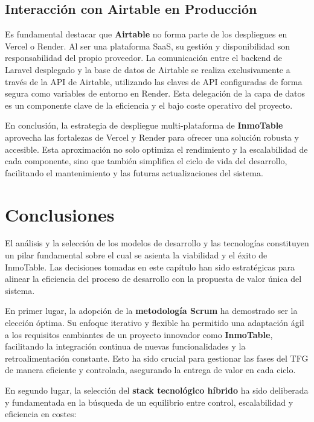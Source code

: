 \subsection{Interacción con Airtable en Producción}


Es fundamental destacar que \textbf{Airtable} no forma parte de los despliegues en Vercel o Render. Al ser una plataforma SaaS, su gestión y disponibilidad son responsabilidad del propio proveedor. La comunicación entre el backend de Laravel desplegado y la base de datos de Airtable se realiza exclusivamente a través de la API de Airtable, utilizando las claves de API configuradas de forma segura como variables de entorno en Render. Esta delegación de la capa de datos es un componente clave de la eficiencia y el bajo coste operativo del proyecto.

\clearpage

En conclusión, la estrategia de despliegue multi-plataforma de \textbf{InmoTable} aprovecha las fortalezas de Vercel y Render para ofrecer una solución robusta y accesible. Esta aproximación no solo optimiza el rendimiento y la escalabilidad de cada componente, sino que también simplifica el ciclo de vida del desarrollo, facilitando el mantenimiento y las futuras actualizaciones del sistema.


\section{Conclusiones}


El análisis y la selección de los modelos de desarrollo y las tecnologías constituyen un pilar fundamental sobre el cual se asienta la viabilidad y el éxito de InmoTable. Las decisiones tomadas en este capítulo han sido estratégicas para alinear la eficiencia del proceso de desarrollo con la propuesta de valor única del sistema.

En primer lugar, la adopción de la \textbf{metodología Scrum} ha demostrado ser la elección óptima. Su enfoque iterativo y flexible ha permitido una adaptación ágil a los requisitos cambiantes de un proyecto innovador como \textbf{InmoTable}, facilitando la integración continua de nuevas funcionalidades y la retroalimentación constante. Esto ha sido crucial para gestionar las fases del TFG de manera eficiente y controlada, asegurando la entrega de valor en cada ciclo.

En segundo lugar, la selección del \textbf{stack tecnológico híbrido} ha sido deliberada y fundamentada en la búsqueda de un equilibrio entre control, escalabilidad y eficiencia en costes:

